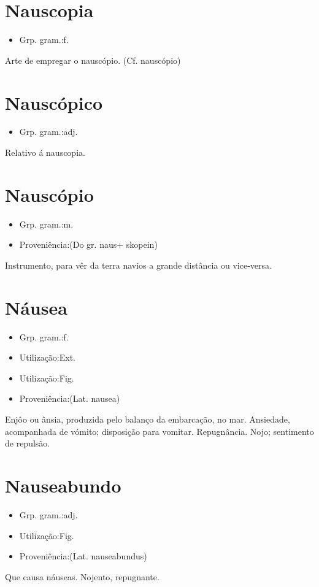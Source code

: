 \section{Nauscopia}
\begin{itemize}
\item {Grp. gram.:f.}
\end{itemize}
Arte de empregar o nauscópio.
(Cf. \textunderscore nauscópio\textunderscore )
\section{Nauscópico}
\begin{itemize}
\item {Grp. gram.:adj.}
\end{itemize}
Relativo á nauscopia.
\section{Nauscópio}
\begin{itemize}
\item {Grp. gram.:m.}
\end{itemize}
\begin{itemize}
\item {Proveniência:(Do gr. \textunderscore naus\textunderscore  + \textunderscore skopein\textunderscore )}
\end{itemize}
Instrumento, para vêr da terra navios a grande distância ou vice-versa.
\section{Náusea}
\begin{itemize}
\item {Grp. gram.:f.}
\end{itemize}
\begin{itemize}
\item {Utilização:Ext.}
\end{itemize}
\begin{itemize}
\item {Utilização:Fig.}
\end{itemize}
\begin{itemize}
\item {Proveniência:(Lat. \textunderscore nausea\textunderscore )}
\end{itemize}
Enjôo ou ânsia, produzida pelo balanço da embarcação, no mar.
Ansiedade, acompanhada de vómito; disposição para vomitar.
Repugnância.
Nojo; sentimento de repulsão.
\section{Nauseabundo}
\begin{itemize}
\item {Grp. gram.:adj.}
\end{itemize}
\begin{itemize}
\item {Utilização:Fig.}
\end{itemize}
\begin{itemize}
\item {Proveniência:(Lat. \textunderscore nauseabundus\textunderscore )}
\end{itemize}
Que causa náuseas.
Nojento, repugnante.

